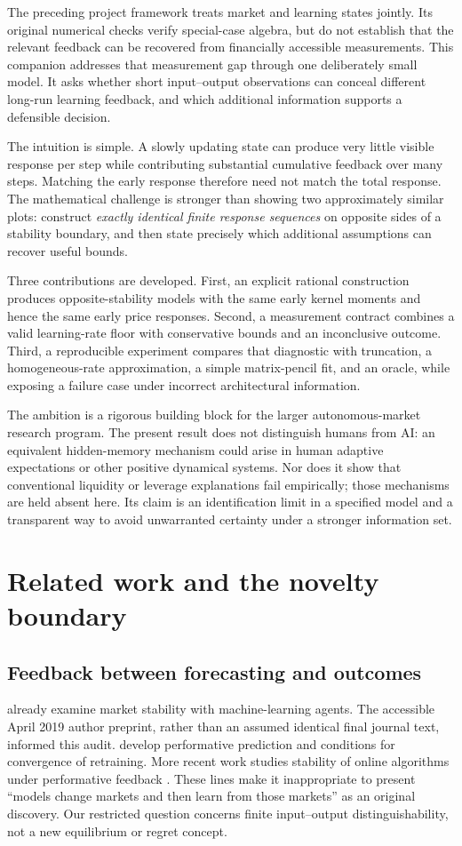 \documentclass[11pt]{article}
\theoremstyle{remark}\newtheorem{remark}[theorem]{Remark}
\begin{document}
The preceding project framework treats market and learning states jointly. Its original numerical checks verify special-case algebra, but do not establish that the relevant feedback can be recovered from financially accessible measurements. This companion addresses that measurement gap through one deliberately small model. It asks whether short input--output observations can conceal different long-run learning feedback, and which additional information supports a defensible decision.

The intuition is simple. A slowly updating state can produce very little visible response per step while contributing substantial cumulative feedback over many steps. Matching the early response therefore need not match the total response. The mathematical challenge is stronger than showing two approximately similar plots: construct \emph{exactly identical finite response sequences} on opposite sides of a stability boundary, and then state precisely which additional assumptions can recover useful bounds.

Three contributions are developed. First, an explicit rational construction produces opposite-stability models with the same early kernel moments and hence the same early price responses. Second, a measurement contract combines a valid learning-rate floor with conservative bounds and an inconclusive outcome. Third, a reproducible experiment compares that diagnostic with truncation, a homogeneous-rate approximation, a simple matrix-pencil fit, and an oracle, while exposing a failure case under incorrect architectural information.

The ambition is a rigorous building block for the larger autonomous-market research program. The present result does not distinguish humans from AI: an equivalent hidden-memory mechanism could arise in human adaptive expectations or other positive dynamical systems. Nor does it show that conventional liquidity or leverage explanations fail empirically; those mechanisms are held absent here. Its claim is an identification limit in a specified model and a transparent way to avoid unwarranted certainty under a stronger information set.

\section{Related work and the novelty boundary}
\subsection{Feedback between forecasting and outcomes}
\citet{georges2021} already examine market stability with machine-learning agents. The accessible April 2019 author preprint, rather than an assumed identical final journal text, informed this audit. \citet{perdomo2020} develop performative prediction and conditions for convergence of retraining. More recent work studies stability of online algorithms under performative feedback \citep{farina2026}. These lines make it inappropriate to present ``models change markets and then learn from those markets'' as an original discovery. Our restricted question concerns finite input--output distinguishability, not a new equilibrium or regret concept.
\end{document}
